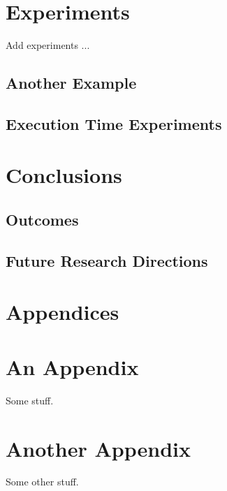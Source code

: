 \documentclass[11pt,twoside]{article}
\numberwithin{Theorem}{section}
\numberwithin{Definition}{section}
\numberwithin{Lemma}{section}
\numberwithin{Algorithm}{section}
\numberwithin{equation}{section}
\begin{document}
\clearpage
\section{Experiments}
Add experiments ...

\subsection{Another Example}

\subsection{Execution Time Experiments}

\section{Conclusions}

\subsection{Outcomes}

\subsection{Future Research Directions}
\clearpage

\printbibliography
\clearpage

\appendix
\section*{Appendices}

\clearpage
\section{An Appendix}
\label{app:one}

Some stuff.
\clearpage

\section{Another Appendix}
\label{app:two}

Some other stuff.
\end{document}
